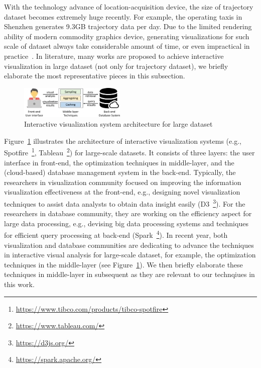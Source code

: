 With the technology advance of location-acquisition device, the size of trajectory dataset becomes extremely huge recently.
For example, the operating taxis in Shenzhen generates 9.3GB trajectory data per day.
Due to the limited rendering ability of modern commodity graphics device, generating visualizations for such scale of dataset always take considerable amount of time, 
or even impractical in practice~\cite{park2016visualization}.
In literature, many works are proposed to achieve interactive visualization in large dataset (not only for trajectory dataset), we briefly elaborate the most representative pieces in this subsection.

\begin{figure}
	\centering
	\includegraphics[width=0.45\textwidth]{pictures/framework/framework.pdf}
	\caption{Interactive visualization system architecture for large dataset}
	\label{fig:framework}
\end{figure}

Figure~\ref{fig:framework} illustrates the architecture of interactive visualization systems (e.g., Spotfire~\footnote{\url{https://www.tibco.com/products/tibco-spotfire}}, Tableau~\footnote{\url{https://www.tableau.com/}}) for large-scale datasets.
It consists of three layers: the user interface in front-end, the optimization techniques in middle-layer, and the (cloud-based) database management system in the back-end.
Typically, the researchers in visualization community focused on improving the information visualization effectiveness at the front-end, 
e.g., designing novel visualization techniques to assist data analysts to obtain data insight easily (D3~\footnote{\url{https://d3js.org/}}).
For the researchers in database community, they are working on the efficiency aspect for large data processing,
e.g., devising big data processing systems and techniques for efficient query processing at back-end (Spark~\footnote{\url{https://spark.apache.org/}}).
In recent year, both visualization and database communities are dedicating to advance the techniques in interactive visual analysis for large-scale dataset,
for example, the optimization techniques in the middle-layer (see Figure~\ref{fig:framework}).
We then briefly elaborate these techniques in middle-layer in subsequent as they are relevant to our technqiues in this work.

